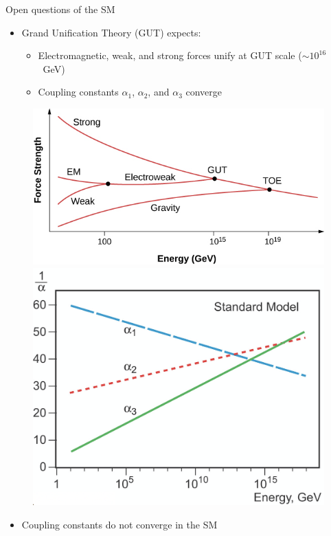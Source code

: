 \documentclass{beamer}
\begin{document}
\begin{frame}{Open questions of the SM}
    \begin{itemize}
        \item Grand Unification Theory (GUT) expects:
        \begin{itemize}
            \item Electromagnetic, weak, and strong forces unify at GUT scale ($\sim 10^{16}$~GeV)
            \item Coupling constants $\alpha_{1}$, $\alpha_{2}$, and $\alpha_{3}$ converge
        \end{itemize}
    \end{itemize}
    \begin{figure}
        \includegraphics[scale=0.7]{figures/GUT.jpg}
        \includegraphics[scale=0.2]{figures/coupling_constants_sm.png}
    \end{figure}
    \begin{itemize}
        \item Coupling constants do not converge in the SM
    \end{itemize}
\end{frame}
\end{document}
